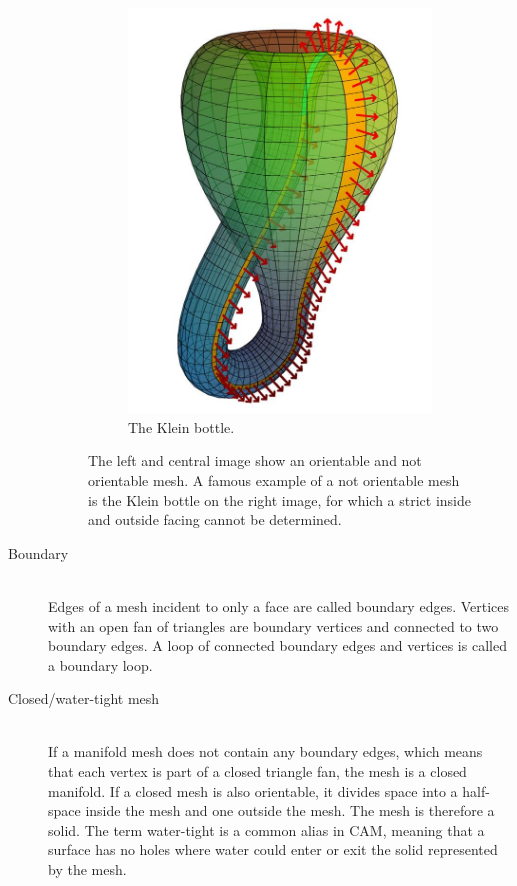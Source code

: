 \begin{description}
\begin{figure}[H]
\begin{subfigure}[b]{0.3\textwidth}
			\includegraphics[width=\textwidth]{images/klein_bottle}
			\caption{The Klein bottle.}
			\label{fig:klein_bottle}
		\end{subfigure}
		\caption[Orientable meshes]{
			The left and central image show an orientable and not orientable mesh.
			A famous example of a not orientable mesh is the Klein bottle on the right image, for which a strict inside and outside facing cannot be determined.
		}
		\label{fig:orientable_mesh}
	\end{figure}


	\item[Boundary] \hfill \\
	Edges of a mesh incident to only a face are called boundary edges.
	Vertices with an open fan of triangles are boundary vertices and connected to two boundary edges.
	A loop of connected boundary edges and vertices is called a boundary loop.


	\item[Closed/water-tight mesh] \hfill \\
	If a manifold mesh does not contain any boundary edges, which means that each vertex is part of a closed triangle fan, the mesh is a closed manifold.
	If a closed mesh is also orientable, it divides space into a half-space inside the mesh and one outside the mesh.
	The mesh is therefore a solid.
	The term water-tight is a common alias in CAM, meaning that a surface has no holes where water could enter or exit the solid represented by the mesh.



\end{description}
